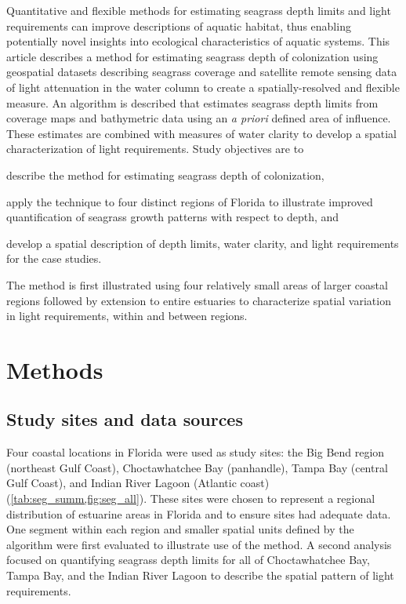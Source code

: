 \documentclass[letterpaper,12pt,oneside]{article}\usepackage[]{graphicx}\usepackage[]{color}
\begin{document}
Quantitative and flexible methods for estimating seagrass depth limits and light requirements can improve descriptions of aquatic habitat, thus enabling potentially novel insights into ecological characteristics of aquatic systems.  This article describes a method for estimating seagrass depth of colonization using geospatial datasets describing seagrass coverage and satellite remote sensing data of light attenuation in the water column to create a spatially-resolved and flexible measure.  An algorithm is described that estimates seagrass depth limits from coverage maps and bathymetric data using an \textit{a priori} defined area of influence. These estimates are combined with measures of water clarity to develop a spatial characterization of light requirements.  Study objectives are to\begin{inparaenum}[1\upshape)]
\item describe the method for estimating seagrass depth of colonization, 
\item apply the technique to four distinct regions of Florida to illustrate improved quantification of seagrass growth patterns with respect to depth, and
\item develop a spatial description of depth limits, water clarity, and light requirements for the case studies.  
\end{inparaenum}
The method is first illustrated using four relatively small areas of larger coastal regions followed by extension to entire estuaries to characterize spatial variation in light requirements, within and between regions.

\section{Methods}

\subsection{Study sites and data sources} \label{sec:data_srcs}

Four coastal locations in Florida were used as study sites: the Big Bend region (northeast Gulf Coast), Choctawhatchee Bay (panhandle), Tampa Bay (central Gulf Coast), and Indian River Lagoon (Atlantic coast) (\cref{tab:seg_summ,fig:seg_all}).  These sites were chosen to represent a regional distribution of estuarine areas in Florida and to ensure sites had adequate data. One segment within each region and smaller spatial units defined by the algorithm were first evaluated to illustrate use of the method.  A second analysis focused on quantifying seagrass depth limits for all of Choctawhatchee Bay, Tampa Bay, and the Indian River Lagoon to describe the spatial pattern of light requirements.
\end{document}
